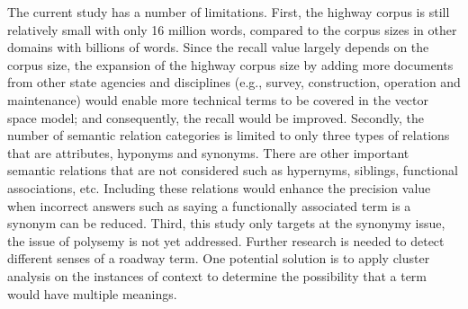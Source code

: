 \documentclass[Journal, BackFigs, DoubleSpace]{ascelike}%
\begin{document}
\par
%
The current study has a number of limitations. First, the highway corpus is still relatively small with only 16 million words, compared to the corpus sizes in other domains with billions of words. Since the recall value largely depends on the corpus size, the expansion of the highway corpus size by adding more documents from other state agencies and disciplines (e.g., survey, construction, operation and maintenance) would enable more technical terms to be covered in the vector space model; and consequently, the recall would be improved. Secondly, the number of semantic relation categories is limited to only three types of relations that are attributes, hyponyms and synonyms. There are other important semantic relations that are not considered such as hypernyms, siblings, functional associations, etc. Including these relations would enhance the precision value when incorrect answers such as saying a functionally associated term is a synonym can be reduced. Third, this study only targets at the synonymy issue, the issue of polysemy is not yet addressed. Further research is needed to detect different senses of a roadway term. One potential solution is to apply cluster analysis on the instances of context to determine the possibility that a term would have multiple meanings. %
\end{document}
